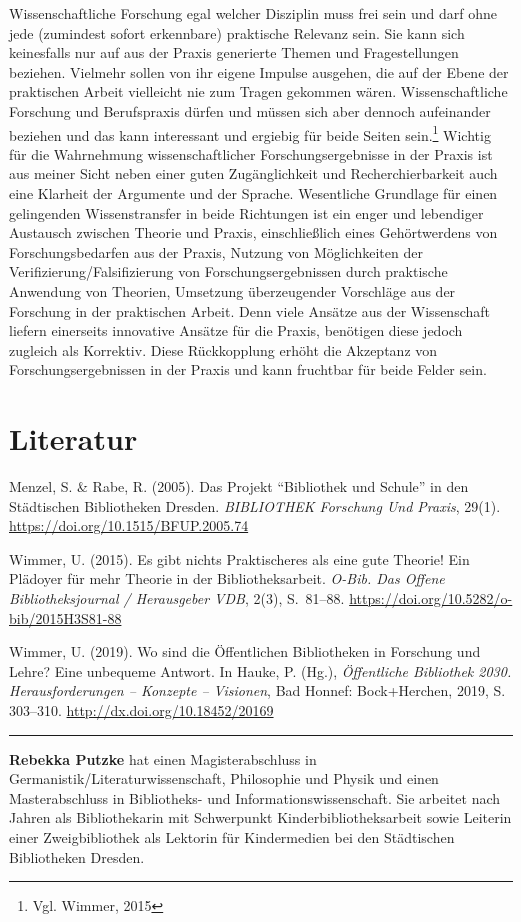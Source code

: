 \documentclass[a4paper,
fontsize=11pt,
oneside,
numbers=noperiodatend,
parskip=half-,
bibliography=totoc,
final
]{scrartcl}
\renewcommand{\linethickness}{0.05em}
\begin{document}
Wissenschaftliche Forschung egal welcher Disziplin muss frei sein und
darf ohne jede (zumindest sofort erkennbare) praktische Relevanz sein.
Sie kann sich keinesfalls nur auf aus der Praxis generierte Themen und
Fragestellungen beziehen. Vielmehr sollen von ihr eigene Impulse
ausgehen, die auf der Ebene der praktischen Arbeit vielleicht nie zum
Tragen gekommen wären. Wissenschaftliche Forschung und Berufspraxis
dürfen und müssen sich aber dennoch aufeinander beziehen und das kann
interessant und ergiebig für beide Seiten sein.\footnote{Vgl. Wimmer,
  2015} Wichtig für die Wahrnehmung wissenschaftlicher
Forschungsergebnisse in der Praxis ist aus meiner Sicht neben einer
guten Zugänglichkeit und Recherchierbarkeit auch eine Klarheit der
Argumente und der Sprache. Wesentliche Grundlage für einen gelingenden
Wissenstransfer in beide Richtungen ist ein enger und lebendiger
Austausch zwischen Theorie und Praxis, einschließlich eines
Gehörtwerdens von Forschungsbedarfen aus der Praxis, Nutzung von
Möglichkeiten der Verifizierung/Falsifizierung von Forschungsergebnissen
durch praktische Anwendung von Theorien, Umsetzung überzeugender
Vorschläge aus der Forschung in der praktischen Arbeit. Denn viele
Ansätze aus der Wissenschaft liefern einerseits innovative Ansätze für
die Praxis, benötigen diese jedoch zugleich als Korrektiv. Diese
Rückkopplung erhöht die Akzeptanz von Forschungsergebnissen in der
Praxis und kann fruchtbar für beide Felder sein.

\hypertarget{literatur}{%
\section{Literatur}\label{literatur}}

Menzel, S. \& Rabe, R. (2005). Das Projekt \enquote{Bibliothek und
Schule} in den Städtischen Bibliotheken Dresden. \emph{BIBLIOTHEK
Forschung Und Praxis}, 29(1). \url{https://doi.org/10.1515/BFUP.2005.74}

Wimmer, U. (2015). Es gibt nichts Praktischeres als eine gute Theorie!
Ein Plädoyer für mehr Theorie in der Bibliotheksarbeit. \emph{O-Bib. Das
Offene Bibliotheksjournal / Herausgeber VDB}, 2(3), \hbox{S. 81--88}.
\url{https://doi.org/10.5282/o-bib/2015H3S81-88}

Wimmer, U. (2019). Wo sind die Öffentlichen Bibliotheken in Forschung
und Lehre? Eine unbequeme Antwort. In Hauke, P. (Hg.), \emph{Öffentliche
Bibliothek 2030. Herausforderungen -- Konzepte -- Visionen}, Bad Honnef:
Bock+Herchen, 2019, S. 303--310. \url{http://dx.doi.org/10.18452/20169}

\begin{center}\rule{0.5\linewidth}{\linethickness}\end{center}

\textbf{Rebekka Putzke} hat einen Magisterabschluss in
Germanistik/Literaturwissenschaft, Philosophie und Physik und einen
Masterabschluss in Bibliotheks- und Informationswissenschaft. Sie
arbeitet nach Jahren als Bibliothekarin mit Schwerpunkt
Kinderbibliotheksarbeit sowie Leiterin einer Zweigbibliothek als
Lektorin für Kindermedien bei den Städtischen Bibliotheken Dresden.
\end{document}
